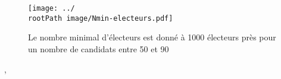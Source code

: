 \documentclass[conference]{IEEEtran}
\newcommand*{\rootPath}{../}
\begin{document}
\begin{figure}[!ht]
  \centering
  \texttt{[image: ../\\rootPath image/Nmin-electeurs.pdf]}
  \caption{Le nombre minimal d'\'electeurs est donn\'e \`a 1000 \'electeurs pr\`es pour un nombre de candidats entre 50 et 90}
  \label{fig:minElecteurs}
\end{figure}

, 
\end{document}
